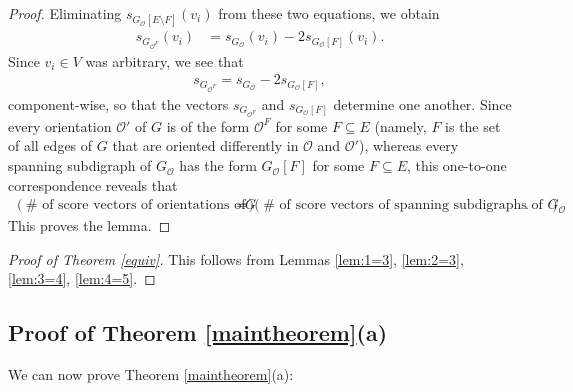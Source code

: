 \documentclass[12pt]{article}
\theoremstyle{definition}
\theoremstyle{remark}
\newcommand{\Or}{\mathcal{O}}
\begin{document}
\begin{proof}
	Eliminating $s_{G_{\mathcal{O}}[E\setminus F]}(v_i)$ from these two equations, we obtain
	\begin{align*}
        s_{G_{\mathcal{O}^F}}(v_i) &= s_{G_{\mathcal{O}}}(v_i) - 2s_{G_{\mathcal{O}}[F]}(v_i).
    \end{align*} Since $v_i \in V$ was arbitrary, we see that \begin{align*}
        s_{G_{\mathcal{O}^F}} = s_{G_{\mathcal{O}}}-2s_{G_{\mathcal{O}}[F]},
    \end{align*} component-wise, so that the vectors $s_{G_{\mathcal{O}^F}}$ and $s_{G_{\mathcal{O}}[F]}$ determine one another. Since every orientation $\Or'$ of $G$ is of the form $\mathcal{O}^F$ for some $F \subseteq E$ (namely, $F$ is the set of all edges of $G$ that are oriented differently in $\Or$ and $\Or'$),
	whereas every spanning subdigraph of $G_{\Or}$ has the form $G_{\Or}[F]$ for some $F \subseteq E$,
	this one-to-one correspondence reveals that \begin{align*}
        (\# \text{ of score vectors of orientations of $G$}) &= (\# \text{ of score vectors of spanning subdigraphs of $G_{\mathcal{O}}$}).
    \end{align*}
    This proves the lemma.
\end{proof} 

\begin{proof}[Proof of Theorem \ref{equiv}]
    This follows from Lemmas \ref{lem:1=3}, \ref{lem:2=3}, \ref{lem:3=4}, \ref{lem:4=5}.
\end{proof}

\subsection{Proof of Theorem \ref{maintheorem}(a)}
We can now prove Theorem \ref{maintheorem}(a):
\end{document}
